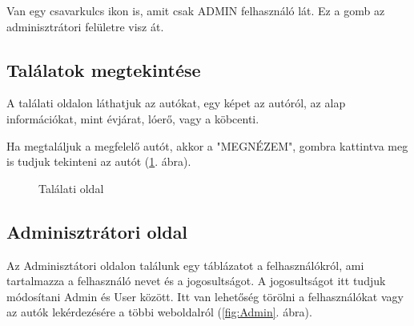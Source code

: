 Van egy csavarkulcs ikon is, amit csak ADMIN felhasználó lát. Ez a gomb az adminisztrátori felületre visz át.

\subsection{Találatok megtekintése}

A találati oldalon láthatjuk az autókat, egy képet az autóról, az alap információkat, mint évjárat, lóerő, vagy a köbcenti.

Ha megtaláljuk a megfelelő autót, akkor a "MEGNÉZEM", gombra kattintva meg is tudjuk tekinteni az autót (\ref{fig:Talalatok}. ábra).
\newpage

\begin{figure}[h]
\centering
{}
\caption{Találati oldal}
\label{fig:Talalatok}
\end{figure}

\subsection{Adminisztrátori oldal}

Az Adminisztátori oldalon találunk egy táblázatot a felhasználókról, ami tartalmazza a felhasználó nevet és a jogosultságot. A jogosultságot itt tudjuk módosítani Admin és User között. Itt van lehetőség törölni a felhasználókat vagy az autók lekérdezésére a többi weboldalról (\ref{fig:Admin}. ábra).


